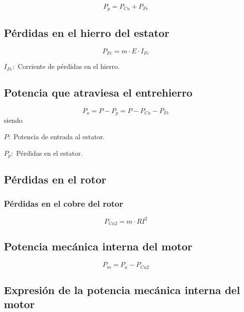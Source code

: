 \documentclass[../main]{subfiles}
\begin{document}
\begin{equation}
    P_p= P_{Cu} + P_{Fe}
\end{equation}


\subsection{Pérdidas en el hierro del estator}

\begin{equation}
    P_{Fe}=m \cdot E \cdot I_{Fe}
\end{equation}

$I_{Fe}:$ Corriente de pérdidas en el hierro.

\subsection{Potencia que atraviesa el entrehierro}

\begin{equation}
P_a = P- P_p = P-P_{Cu} - P_{Fe}
\end{equation}
 siendo

$P:$ Potencia de entrada al estator.

$P_p:$ Pérdidas en el estator.

\subsection{Pérdidas en el rotor}
\subsubsection{Pérdidas en el cobre del rotor}

\begin{equation}
    P_{Cu2}= m \cdot R I^2
\end{equation}

\subsection{Potencia mecánica interna del motor}

\begin{equation}
    P_m=P_a-P_{Cu2}
\end{equation}

\subsection{Expresión de la potencia mecánica interna del motor}
\end{document}
